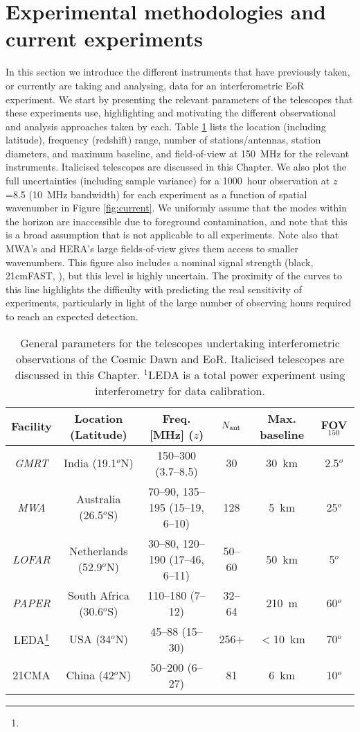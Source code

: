 \section{Experimental methodologies and current experiments}
\label{sec:methodologies}
In this section we introduce the different instruments that have previously taken, or currently are taking and analysing, data for an interferometric EoR experiment. We start by presenting the relevant parameters of the telescopes that these experiments use, highlighting and motivating the different observational and analysis approaches taken by each. Table \ref{table:parameters} lists the location (including latitude), frequency (redshift) range, number of stations/antennas, station diameters, and maximum baseline, and field-of-view at 150\, MHz for the relevant instruments. Italicised telescopes are discussed in this Chapter. We also plot the full uncertainties (including sample variance) for a 1000~hour observation at $z$=8.5 (10~MHz bandwidth) for each experiment as a function of spatial wavenumber in Figure \ref{fig:current}. We uniformly assume that the modes within the horizon are inaccessible due to foreground contamination, and note that this is a broad assumption that is not applicable to all experiments. Note also that MWA's and HERA's large fields-of-view gives them access to smaller wavenumbers. This figure also includes a nominal signal strength (black, 21cmFAST, \cite{mesinger11}), but this level is highly uncertain. The proximity of the curves to this line highlights the difficulty with predicting the real sensitivity of experiments, particularly in light of the large number of observing hours required to reach an expected detection.
\begin{table}[ht]
\centering
\begin{tabular}{|c||c|c|c|c|c|}
\hline 
Facility & Location (Latitude) & Freq. [MHz] ($z$) & $N_{\rm ant}$ & Max. baseline & FOV$_{150}$ \\
\hline
\textit{GMRT} & India (19.1$^{o}$N) & 150--300 (3.7--8.5) & 30 & 30~km & 2.5$^{o}$\\
\textit{MWA} & Australia (26.5$^{o}$S) & 70--90, 135--195 (15--19, 6--10) & 128 & 5~km & 25$^{o}$\\
\textit{LOFAR} & Netherlands (52.9$^{o}$N) & 30--80, 120--190 (17--46, 6--11) & 50--60 & 50~km & 5$^{o}$\\
\textit{PAPER} & South Africa (30.6$^{o}$S) & 110--180 (7--12) & 32--64 & 210~m & 60$^{o}$\\
LEDA\footnote[1]{} & USA (34$^{o}$N) & 45--88 (15--30) & 256+ & $<$10~km & 70$^{o}$\\
21CMA & China (42$^{o}$N) & 50--200 (6--27) & 81 & 6~km & 10$^{o}$\\
\hline \hline
\end{tabular}
\label{table:parameters}
\caption{General parameters for the telescopes undertaking interferometric observations of the Cosmic Dawn and EoR. Italicised telescopes are discussed in this Chapter. $^1$LEDA is a total power experiment using interferometry for data calibration.}
\end{table}
